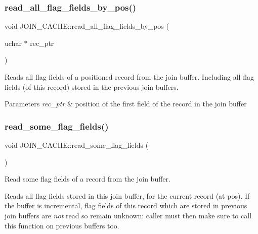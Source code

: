 \subsubsection{\texorpdfstring{read\+\_\+all\+\_\+flag\+\_\+fields\+\_\+by\+\_\+pos()}{read\_all\_flag\_fields\_by\_pos()}}
{\footnotesize\ttfamily void J\+O\+I\+N\+\_\+\+C\+A\+C\+H\+E\+::read\+\_\+all\+\_\+flag\+\_\+fields\+\_\+by\+\_\+pos (\begin{DoxyParamCaption}\item[{uchar $\ast$}]{rec\+\_\+ptr }\end{DoxyParamCaption})\hspace{0.3cm}{\ttfamily [protected]}}

Reads all flag fields of a positioned record from the join buffer. Including all flag fields (of this record) stored in the previous join buffers.


\begin{DoxyParams}{Parameters}
{\em rec\+\_\+ptr} & position of the first field of the record in the join buffer \\
\hline
\end{DoxyParams}
\mbox{\label{group__Query__Optimizer_gafa19cecc5eccee0ff1285c62769daf39}} 
\subsubsection{\texorpdfstring{read\+\_\+some\+\_\+flag\+\_\+fields()}{read\_some\_flag\_fields()}}
{\footnotesize\ttfamily void J\+O\+I\+N\+\_\+\+C\+A\+C\+H\+E\+::read\+\_\+some\+\_\+flag\+\_\+fields (\begin{DoxyParamCaption}{ }\end{DoxyParamCaption})\hspace{0.3cm}{\ttfamily [protected]}}

Read some flag fields of a record from the join buffer.

Reads all flag fields stored in this join buffer, for the current record (at \textquotesingle{}pos\textquotesingle{}). If the buffer is incremental, flag fields of this record which are stored in previous join buffers are {\itshape not} read so remain unknown\+: caller must then make sure to call this function on previous buffers too.

